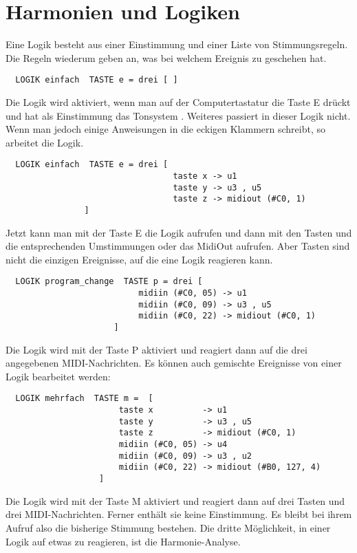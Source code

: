 \section{Harmonien und Logiken}\label{sec:harm-und-logik}
Eine Logik besteht aus einer Einstimmung und einer Liste von
Stimmungsregeln. Die Regeln wiederum geben an, was bei
welchem Ereignis zu geschehen hat.
\begin{verbatim}
  LOGIK einfach  TASTE e = drei [ ]
\end{verbatim}
Die Logik  wird aktiviert, wenn man auf der Computertastatur die Taste E
drückt und hat als Einstimmung das Tonsystem .
Weiteres passiert in dieser Logik nicht. Wenn man jedoch einige
Anweisungen in die eckigen Klammern schreibt, so arbeitet die
Logik.
\begin{verbatim}
  LOGIK einfach  TASTE e = drei [ 
                                  taste x -> u1
                                  taste y -> u3 , u5
                                  taste z -> midiout (#C0, 1)
				]
\end{verbatim}
Jetzt kann man mit der Taste E die Logik  aufrufen
und dann mit den Tasten  und  die entsprechenden
Umstimmungen oder das MidiOut aufrufen.
Aber Tasten sind nicht die einzigen Ereignisse, auf die eine
Logik reagieren kann.
\begin{verbatim}
  LOGIK program_change  TASTE p = drei [ 
                           midiin (#C0, 05) -> u1
                           midiin (#C0, 09) -> u3 , u5
                           midiin (#C0, 22) -> midiout (#C0, 1)
                      ]
\end{verbatim}
Die Logik  wird mit der Taste P aktiviert und
reagiert dann auf die drei angegebenen MIDI-Nachrichten.
Es können auch gemischte Ereignisse von einer Logik bearbeitet
werden:
\begin{verbatim}
  LOGIK mehrfach  TASTE m =  [ 
                       taste x          -> u1
                       taste y          -> u3 , u5
                       taste z          -> midiout (#C0, 1)
                       midiin (#C0, 05) -> u4
                       midiin (#C0, 09) -> u3 , u2
                       midiin (#C0, 22) -> midiout (#B0, 127, 4)
                   ]
\end{verbatim}
Die Logik  wird mit der Taste M aktiviert und
reagiert dann auf drei Tasten und drei MIDI-Nachrichten.
Ferner enthält sie keine Einstimmung. 
Es bleibt bei ihrem Aufruf also
die bisherige Stimmung bestehen. 
Die dritte Möglichkeit, in einer Logik auf etwas zu reagieren,
ist die Harmonie-Analyse. 

